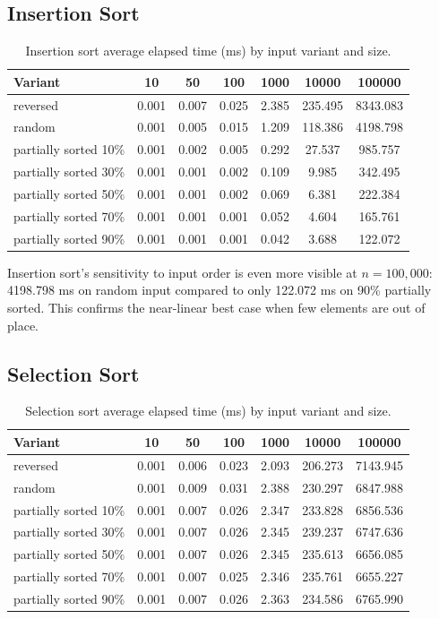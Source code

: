 \documentclass[11pt,a4paper]{article}
\begin{document}
\subsection{Insertion Sort}
\begin{table}[H]
\centering
\footnotesize
\begin{tabular}{lcccccc}
\toprule
Variant & 10 & 50 & 100 & 1000 & 10000 & 100000 \\
\midrule
reversed & 0.001 & 0.007 & 0.025 & 2.385 & 235.495 & 8343.083 \\
random & 0.001 & 0.005 & 0.015 & 1.209 & 118.386 & 4198.798 \\
partially sorted 10\% & 0.001 & 0.002 & 0.005 & 0.292 & 27.537 & 985.757 \\
partially sorted 30\% & 0.001 & 0.001 & 0.002 & 0.109 & 9.985 & 342.495 \\
partially sorted 50\% & 0.001 & 0.001 & 0.002 & 0.069 & 6.381 & 222.384 \\
partially sorted 70\% & 0.001 & 0.001 & 0.001 & 0.052 & 4.604 & 165.761 \\
partially sorted 90\% & 0.001 & 0.001 & 0.001 & 0.042 & 3.688 & 122.072 \\
\bottomrule
\end{tabular}
\caption{Insertion sort average elapsed time (ms) by input variant and size.}
\label{tab:insertion-results}
\end{table}

Insertion sort's sensitivity to input order is even more visible at \(n=100{,}000\): 4198.798 ms on random input compared to only 122.072 ms on 90\% partially sorted. This confirms the near-linear best case when few elements are out of place.

\subsection{Selection Sort}
\begin{table}[H]
\centering
\footnotesize
\begin{tabular}{lcccccc}
\toprule
Variant & 10 & 50 & 100 & 1000 & 10000 & 100000 \\
\midrule
reversed & 0.001 & 0.006 & 0.023 & 2.093 & 206.273 & 7143.945 \\
random & 0.001 & 0.009 & 0.031 & 2.388 & 230.297 & 6847.988 \\
partially sorted 10\% & 0.001 & 0.007 & 0.026 & 2.347 & 233.828 & 6856.536 \\
partially sorted 30\% & 0.001 & 0.007 & 0.026 & 2.345 & 239.237 & 6747.636 \\
partially sorted 50\% & 0.001 & 0.007 & 0.026 & 2.345 & 235.613 & 6656.085 \\
partially sorted 70\% & 0.001 & 0.007 & 0.025 & 2.346 & 235.761 & 6655.227 \\
partially sorted 90\% & 0.001 & 0.007 & 0.026 & 2.363 & 234.586 & 6765.990 \\
\bottomrule
\end{tabular}
\caption{Selection sort average elapsed time (ms) by input variant and size.}
\label{tab:selection-results}
\end{table}
\end{document}

